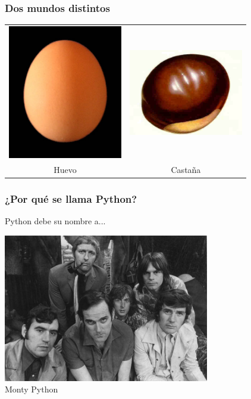 \documentclass{beamer}
\begin{document}
\begin{frame}
 \frametitle{Dos mundos distintos}
\begin{center}
 \begin{tabular}[h]{cc}
   \includegraphics[width=5cm]{files/huevo.jpg} &
   \includegraphics[width=5cm]{files/castana.jpg}\\
   Huevo & Castaña
 \end{tabular}
\end{center}
\end{frame}


\begin{frame}
 \frametitle{¿Por qué se llama Python?}
 Python debe su nombre a...
\end{frame}

\begin{frame}
 \begin{center}
 \includegraphics[width=9cm]{files/python.jpg}\\
Monty Python
\end{center}

\end{frame}
\end{document}
